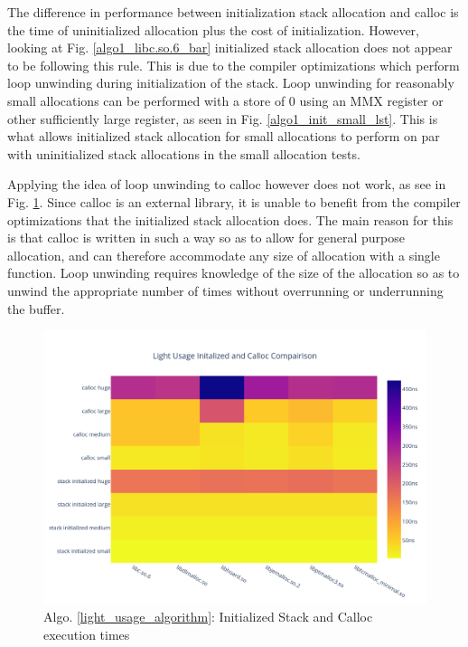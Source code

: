 \documentclass[letterpaper, 10 pt, conference]{ieeeconf}  %
\begin{document}
The difference in performance between initialization stack allocation and calloc is the time of uninitialized allocation plus the cost of initialization.
However, looking at Fig. \ref{algo1_libc.so.6_bar} initialized stack allocation does not appear to be following this rule.
This is due to the compiler optimizations which perform loop unwinding during initialization of the stack.
Loop unwinding for reasonably small allocations can be performed with a store of $0$ using an MMX register or other sufficiently large register, as seen in Fig. \ref{algo1_init_small_lst}.
This is what allows initialized stack allocation for small allocations to perform on par with uninitialized stack allocations in the small allocation tests.

Applying the idea of loop unwinding to calloc however does not work, as see in Fig. \ref{algo1_init_calloc_hist}.
Since calloc is an external library, it is unable to benefit from the compiler optimizations that the initialized stack allocation does.
The main reason for this is that calloc is written in such a way so as to allow for general purpose allocation, and can therefore accommodate any size of allocation with a single function.
Loop unwinding requires knowledge of the size of the allocation so as to unwind the appropriate number of times without overrunning or underrunning the buffer. 
\begin{figure}[tbh!]
  \centering
  \includegraphics[width=\columnwidth]{graphs/light_init_calloc_hist.png}
  \caption{ Algo. \ref{light_usage_algorithm}: Initialized Stack and Calloc execution times }
  \label{algo1_init_calloc_hist}
\end{figure} 
\end{document}
